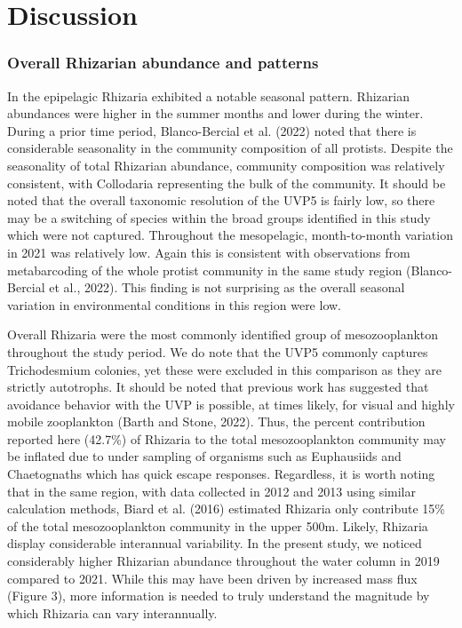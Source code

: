 \documentclass[
]{article}
\begin{document}
\hypertarget{discussion}{%
\section{Discussion}\label{discussion}}

\hypertarget{overall-rhizarian-abundance-and-patterns}{%
\subsubsection{Overall Rhizarian abundance and
patterns}\label{overall-rhizarian-abundance-and-patterns}}

In the epipelagic Rhizaria exhibited a notable seasonal pattern.
Rhizarian abundances were higher in the summer months and lower during
the winter. During a prior time period, Blanco-Bercial et al. (2022)
noted that there is considerable seasonality in the community
composition of all protists. Despite the seasonality of total Rhizarian
abundance, community composition was relatively consistent, with
Collodaria representing the bulk of the community. It should be noted
that the overall taxonomic resolution of the UVP5 is fairly low, so
there may be a switching of species within the broad groups identified
in this study which were not captured. Throughout the mesopelagic,
month-to-month variation in 2021 was relatively low. Again this is
consistent with observations from metabarcoding of the whole protist
community in the same study region (Blanco-Bercial et al., 2022). This
finding is not surprising as the overall seasonal variation in
environmental conditions in this region were low.

Overall Rhizaria were the most commonly identified group of
mesozooplankton throughout the study period. We do note that the UVP5
commonly captures Trichodesmium colonies, yet these were excluded in
this comparison as they are strictly autotrophs. It should be noted that
previous work has suggested that avoidance behavior with the UVP is
possible, at times likely, for visual and highly mobile zooplankton
(Barth and Stone, 2022). Thus, the percent contribution reported here
(42.7\%) of Rhizaria to the total mesozooplankton community may be
inflated due to under sampling of organisms such as Euphausiids and
Chaetognaths which has quick escape responses. Regardless, it is worth
noting that in the same region, with data collected in 2012 and 2013
using similar calculation methods, Biard et al. (2016) estimated
Rhizaria only contribute 15\% of the total mesozooplankton community in
the upper 500m. Likely, Rhizaria display considerable interannual
variability. In the present study, we noticed considerably higher
Rhizarian abundance throughout the water column in 2019 compared to
2021. While this may have been driven by increased mass flux (Figure 3),
more information is needed to truly understand the magnitude by which
Rhizaria can vary interannually.
\end{document}
